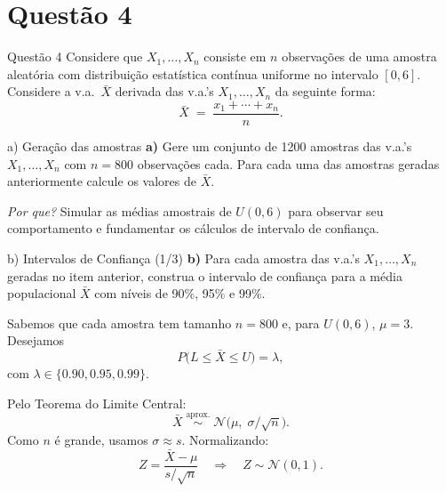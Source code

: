 \section{Questão 4}

\begin{frame}{Questão 4}
Considere que $X_1,\dots,X_n$ consiste em $n$ observações de uma amostra aleatória com distribuição estatística contínua uniforme no intervalo $[0,6]$. Considere a v.a.\ $\bar X$ derivada das v.a.’s $X_1,\dots,X_n$ da seguinte forma:
\[
\bar X \;=\;\frac{x_1 + \cdots + x_n}{n}.
\]
\end{frame}

\begin{frame}[fragile]{a) Geração das amostras}
\textbf{a)} Gere um conjunto de 1200 amostras das v.a.’s $X_1,\dots,X_n$ com $n=800$ observações cada. Para cada uma das amostras geradas anteriormente calcule os valores de  $\bar X$.

\vspace{0.5em}
\textit{Por que?} Simular as médias amostrais de $U(0,6)$ para observar seu comportamento e fundamentar os cálculos de intervalo de confiança.

\vspace{0.5em}

\end{frame}

\begin{frame}{b) Intervalos de Confiança (1/3)}
\textbf{b)} Para cada amostra das v.a.’s $X_1,\dots,X_n$ geradas no item anterior, construa o intervalo de confiança para a média populacional $\bar X$ com níveis de 90\%, 95\% e 99\%.

\vspace{0.5em}
Sabemos que cada amostra tem tamanho $n=800$ e, para $U(0,6)$, $\mu=3$. Desejamos
\[
P\bigl(L \le \bar X \le U\bigr) = \lambda,
\]
com $\lambda\in\{0.90,0.95,0.99\}$.

\vspace{0.7em}
Pelo Teorema do Limite Central:
\[
\bar X \;\overset{\text{aprox.}}{\sim}\;\mathcal N\!\bigl(\mu,\;\sigma/\sqrt{n}\bigr).
\]
Como $n$ é grande, usamos $\sigma\approx s$. Normalizando:
\[
Z = \frac{\bar X - \mu}{s/\sqrt{n}}
\quad\Longrightarrow\quad
Z \sim \mathcal N(0,1).
\]
\end{frame}

